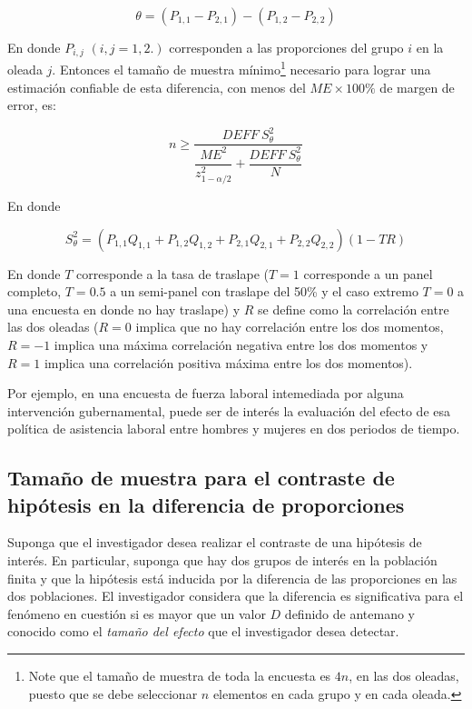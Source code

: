 \documentclass[
  12pt,
]{book}
\begin{document}
\[
\theta = (P_{1,1}-P_{2,1})-(P_{1,2}-P_{2, 2})
\]

En donde \(P_{i,j}\) \((i, j = 1, 2.)\) corresponden a las proporciones del grupo \(i\) en la oleada \(j\). Entonces el tamaño de muestra mínimo\footnote{Note que el tamaño de muestra de toda la encuesta es \(4n\), en las dos oleadas, puesto que se debe seleccionar \(n\) elementos en cada grupo y en cada oleada.} necesario para lograr una estimación confiable de esta diferencia, con menos del \(ME \times 100\%\) de margen de error, es:

\[
n \geq \dfrac{DEFF \ S^2_{\theta}}{\dfrac{ME^2}{z_{1 - \alpha/2}^2}+\dfrac{DEFF \ S^2_{\theta}}{N}}
\]

En donde

\[
S^2_{\theta} = (P_{1,1}Q_{1,1}+P_{1,2}Q_{1,2}+P_{2,1}Q_{2,1}+P_{2,2}Q_{2,2})(1-TR)
\]

En donde \(T\) corresponde a la tasa de traslape (\(T=1\) corresponde a un panel completo, \(T=0.5\) a un semi-panel con traslape del 50\% y el caso extremo \(T=0\) a una encuesta en donde no hay traslape) y \(R\) se define como la correlación entre las dos oleadas (\(R=0\) implica que no hay correlación entre los dos momentos, \(R=-1\) implica una máxima correlación negativa entre los dos momentos y \(R=1\) implica una correlación positiva máxima entre los dos momentos).

Por ejemplo, en una encuesta de fuerza laboral intemediada por alguna intervención gubernamental, puede ser de interés la evaluación del efecto de esa política de asistencia laboral entre hombres y mujeres en dos periodos de tiempo.

\hypertarget{tamauxf1o-de-muestra-para-el-contraste-de-hipuxf3tesis-en-la-diferencia-de-proporciones}{%
\subsection{Tamaño de muestra para el contraste de hipótesis en la diferencia de proporciones}\label{tamauxf1o-de-muestra-para-el-contraste-de-hipuxf3tesis-en-la-diferencia-de-proporciones}}

Suponga que el investigador desea realizar el contraste de una hipótesis de interés. En particular, suponga que hay dos grupos de interés en la población finita y que la hipótesis está inducida por la diferencia de las proporciones en las dos poblaciones. El investigador considera que la diferencia es significativa para el fenómeno en cuestión si es mayor que un valor \(D\) definido de antemano y conocido como el \emph{tamaño del efecto} que el investigador desea detectar.
\end{document}
